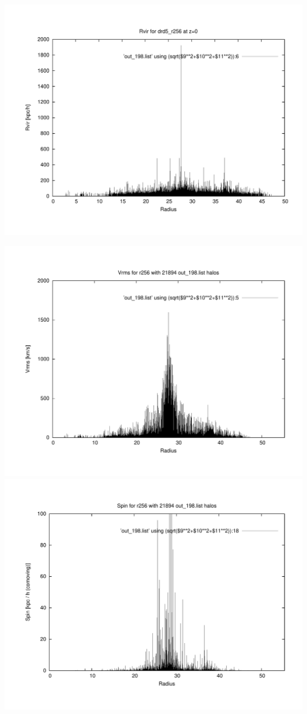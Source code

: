 \includegraphics[scale=0.3]{r256/drd5_r256/plot_rvir_z0.pdf}

\includegraphics[scale=0.3]{r256/drd5_r256/plot_Vrms_out_198.pdf}
\includegraphics[scale=0.3]{r256/drd5_r256/plot_spin_out_198.pdf}

